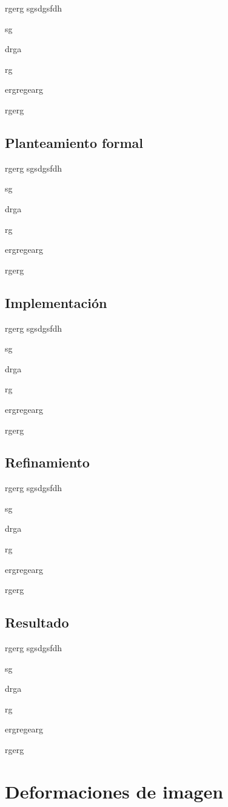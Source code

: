 rgerg
sgsdgsfdh

sg

drga

rg

ergregearg

rgerg

\subsection{Planteamiento formal}

rgerg
sgsdgsfdh

sg

drga

rg

ergregearg

rgerg

\subsection{Implementación}

rgerg
sgsdgsfdh

sg

drga

rg

ergregearg

rgerg

\subsection{Refinamiento}

rgerg
sgsdgsfdh

sg

drga

rg

ergregearg

rgerg

\subsection{Resultado}

rgerg
sgsdgsfdh

sg

drga

rg

ergregearg

rgerg


\section{Deformaciones de imagen}


